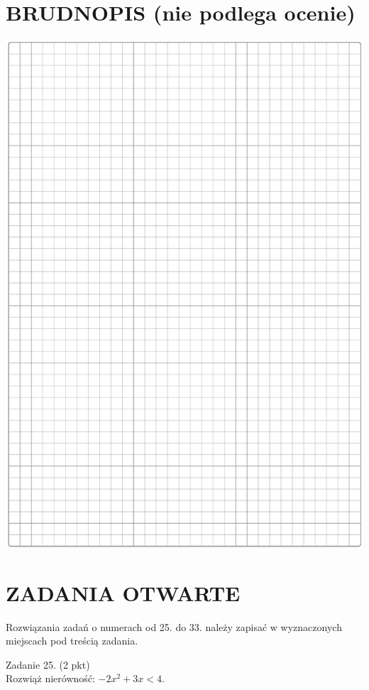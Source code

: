 \documentclass[10pt]{article}
\begin{document}
\section*{BRUDNOPIS (nie podlega ocenie)}
\begin{center}
\includegraphics[max width=\textwidth]{2024_11_21_769d5953f978b92e06f5g-09}
\end{center}

\section*{ZADANIA OTWARTE}
Rozwiązania zadań o numerach od 25. do 33. należy zapisać w wyznaczonych miejscach pod treścią zadania.

Zadanie 25. (2 pkt)\\
Rozwiąż nierówność: \(-2 x^{2}+3 x<4\).
\end{document}
